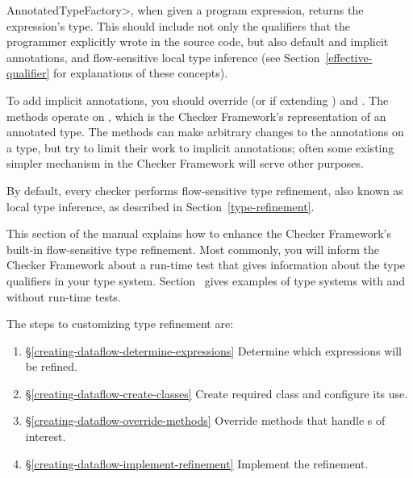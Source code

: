 \<AnnotatedTypeFactory>, when given a program
expression, returns the expression's type.  This should include not only
the qualifiers that the programmer explicitly wrote in the source code, but
also default and implicit annotations, and flow-sensitive local type
inference (see Section~\ref{effective-qualifier} for explanations of these
concepts).

To add implicit annotations, you should override
(or
if extending )
and
.
The methods operate on ,
which is the Checker Framework's representation of an annotated type.
The methods can make arbitrary changes to the annotations on a type, but
try to limit their work to implicit annotations; often some existing
simpler mechanism in the Checker Framework will serve other purposes.



By default, every checker performs flow-sensitive type refinement, also known as
local type inference, as described
in Section~\ref{type-refinement}.

This section of the manual explains how to enhance the Checker Framework's
built-in flow-sensitive type refinement.
Most commonly, you will inform the Checker Framework about a run-time test
that gives information about the type qualifiers in your type system.
Section~ gives examples of
type systems with and without run-time tests.

The steps to customizing type refinement are:
\begin{enumerate}
\item{\S\ref{creating-dataflow-determine-expressions}}
  Determine which expressions will be refined.
\item{\S\ref{creating-dataflow-create-classes}}
  Create required class and configure its use.
\item{\S\ref{creating-dataflow-override-methods}}
  Override methods that handle s of interest.
\item{\S\ref{creating-dataflow-implement-refinement}}
  Implement the refinement.
\end{enumerate}

